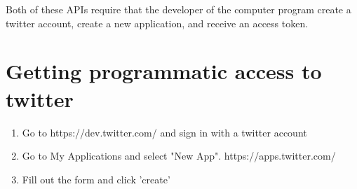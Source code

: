 \documentclass{article}
\begin{document}
Both of these APIs require that the developer of the computer program create a twitter account, create a new application, and receive an access token.

\section*{Getting programmatic access to twitter}
\begin{enumerate}
  \item Go to https://dev.twitter.com/ and sign in with a twitter account
  \item Go to My Applications and select "New App". https://apps.twitter.com/
  \item Fill out the form and click 'create'
\end{enumerate}
\end{document}

